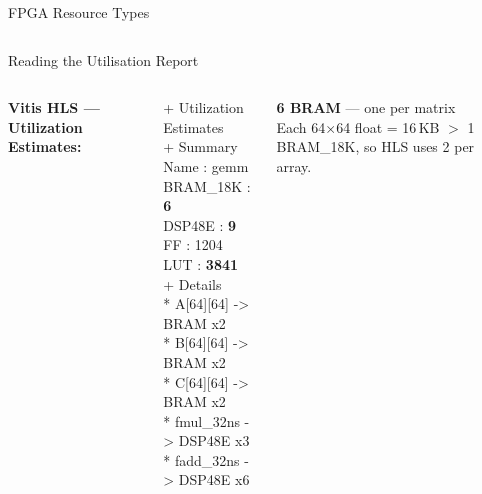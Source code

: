 \documentclass[aspectratio=169,12pt]{beamer}
\begin{document}
\begin{frame}{FPGA Resource Types}
\begin{columns}[T,totalwidth=\textwidth]
\end{columns}
\end{frame}

\begin{frame}{Reading the Utilisation Report}
\vspace{0.05cm}
\begin{columns}[T,totalwidth=\textwidth]

  {\small\color{Navy}\bfseries Vitis HLS — Utilization Estimates:}
  \vspace{3pt}

  \colorbox{NavyDk!6}{\parbox{\dimexpr\linewidth-2\fboxsep\relax}{
  \ttfamily\fontsize{7.5}{10}\selectfont\color{NavyDk}
  + Utilization Estimates\\
  \hspace{1em}+ Summary\\
  \hspace{2em}Name      : gemm\\
  \hspace{2em}BRAM\_18K : \textbf{\color{Orange}6}\\
  \hspace{2em}DSP48E    : \textbf{\color{Teal}9}\\
  \hspace{2em}FF        : 1204\\
  \hspace{2em}LUT       : \textbf{\color{Navy}3841}\\[4pt]
  \hspace{1em}+ Details\\
  \hspace{2em}* A[64][64] -> BRAM x2\\
  \hspace{2em}* B[64][64] -> BRAM x2\\
  \hspace{2em}* C[64][64] -> BRAM x2\\
  \hspace{2em}* fmul\_32ns -> DSP48E x3\\
  \hspace{2em}* fadd\_32ns -> DSP48E x6
  }}

  \vspace{0.2cm}

  \colorbox{Orange!10}{\parbox{\dimexpr\linewidth-2\fboxsep\relax}{\vspace{3pt}
    {\color{Orange}\bfseries 6 BRAM} — one per matrix\\
    {\small Each 64$\times$64 float = 16\,KB $>$ 1 BRAM\_18K, so HLS uses 2 per array.}
  \vspace{3pt}}}


\end{columns}
\end{frame}
\end{document}
